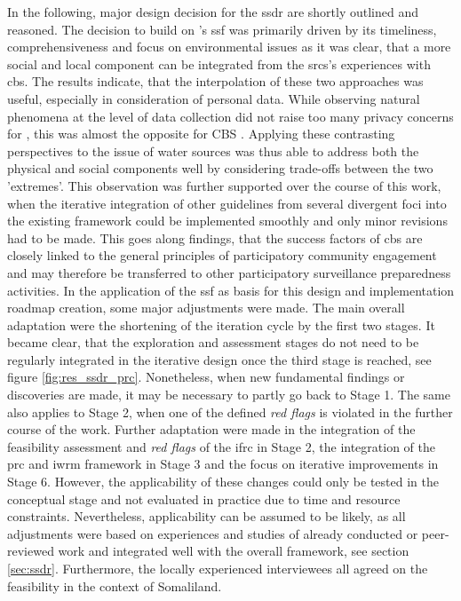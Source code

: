 In the following, major design decision for the \acrshort{ssdr} are shortly outlined and reasoned. The decision to build on \citeauthor{fraislCitizenScienceEnvironmental2022}'s \citeyear{fraislCitizenScienceEnvironmental2022} \acrlong{ssf} was primarily driven by its timeliness, comprehensiveness and focus on environmental issues as it was clear, that a more social and local component can be integrated from the \acrshort{srcs}'s experiences with \acrshort{cbs}. The results indicate, that the interpolation of these two approaches was useful, especially in consideration of personal data. While observing natural phenomena at the level of data collection did not raise too many privacy concerns for \textcite{fraislCitizenScienceEnvironmental2022}, this was almost the opposite for CBS \autocite{ifrcCommunityBasedSurveillanceGuiding2017}. Applying these contrasting perspectives to the issue of water sources was thus able to address both the physical and social components well by considering trade-offs between the two 'extremes'. This observation was further supported over the course of this work, when the iterative integration of other guidelines from several divergent foci into the existing framework could be implemented smoothly and only minor revisions had to be made. This goes along \textcite{mcgowanCommunitybasedSurveillanceInfectious2022} findings, that the success factors of \acrshort{cbs} are closely linked to the general principles of participatory community engagement and may therefore be transferred to other participatory surveillance preparedness activities.\newline
In the application of the \acrshort{ssf} as basis for this design and implementation roadmap creation, some major adjustments were made. The main overall adaptation were the shortening of the iteration cycle by the first two stages. It became clear, that the exploration and assessment stages do not need to be regularly integrated in the iterative design once the third stage is reached, see figure \ref{fig:res_ssdr_prc}. Nonetheless, when new fundamental findings or discoveries are made, it may be necessary to partly go back to Stage 1. The same also applies to Stage 2, when one of the defined \textit{red flags} is violated in the further course of the work. Further adaptation were made in the integration of the feasibility assessment and \textit{red flags} of the \acrshort{ifrc} in Stage 2, the integration of the \acrshort{prc} and \acrshort{iwrm} framework in Stage 3 and the focus on iterative improvements in Stage 6. However, the applicability of these changes could only be tested in the conceptual stage and not evaluated in practice due to time and resource constraints. Nevertheless, applicability can be assumed to be likely, as all adjustments were based on experiences and studies of already conducted or peer-reviewed work and integrated well with the overall framework, see section \ref{sec:ssdr}. Furthermore, the locally experienced interviewees all agreed on the feasibility in the context of Somaliland.

